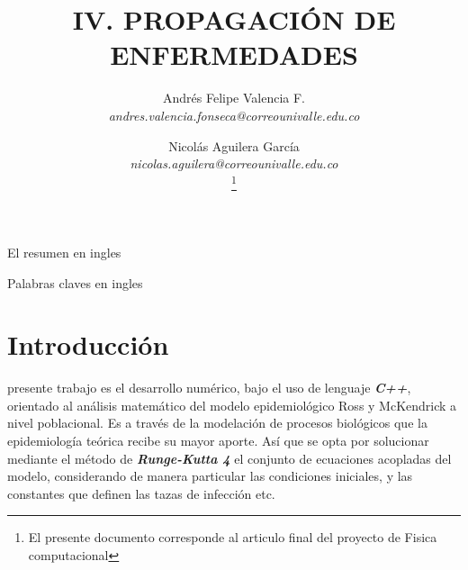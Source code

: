 \documentclass[journal]{IEEEtran}
\begin{document}
\title{IV. PROPAGACIÓN DE ENFERMEDADES}
\author{Andrés Felipe Valencia F. \\
				\textit{andres.valencia.fonseca@correounivalle.edu.co}\\%
        \and
        Nicolás Aguilera García \\
        \textit{nicolas.aguilera@correounivalle.edu.co}\\
\thanks{El presente documento corresponde al articulo final del proyecto de Fisica computacional}} %


\maketitle

\begin{abstract}

\end{abstract}

\begin{IEEEkeywords}

\end{IEEEkeywords}


\begin{abstracteee}
El resumen en ingles
\end{abstracteee}

\begin{IEEEkeywordsa}
Palabras claves en ingles
\end{IEEEkeywordsa}

\section{Introducción}
 presente trabajo es el desarrollo numérico, bajo el uso de lenguaje \textbf{\textit{C++}},
orientado al análisis matemático del modelo epidemiológico Ross \cite{Ross} y McKendrick \cite{Kermack} a nivel poblacional.
Es a través de la modelación de procesos biológicos que la epidemiología teórica recibe su mayor aporte.
Así que se opta por solucionar mediante el método de \textbf{\textit{Runge-Kutta 4}} el conjunto de ecuaciones acopladas del modelo, considerando de manera particular las condiciones
iniciales, y las constantes que definen las tazas de infección etc. 
\end{document}
